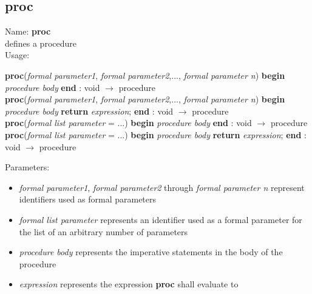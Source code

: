 \subsection{proc}
\label{labproc}
\noindent Name: \textbf{proc}\\
defines a \sollya procedure\\
\noindent Usage: 
\begin{center}
\textbf{proc}(\emph{formal parameter1}, \emph{formal parameter2},..., \emph{formal parameter n}) \textbf{begin} \emph{procedure body} \textbf{end} : \textsf{void} $\rightarrow$ \textsf{procedure}\\
\textbf{proc}(\emph{formal parameter1}, \emph{formal parameter2},..., \emph{formal parameter n}) \textbf{begin} \emph{procedure body} \textbf{return} \emph{expression}; \textbf{end} : \textsf{void} $\rightarrow$ \textsf{procedure}\\
\textbf{proc}(\emph{formal list parameter} = ...) \textbf{begin} \emph{procedure body} \textbf{end} : \textsf{void} $\rightarrow$ \textsf{procedure}\\
\textbf{proc}(\emph{formal list parameter} = ...) \textbf{begin} \emph{procedure body} \textbf{return} \emph{expression}; \textbf{end} : \textsf{void} $\rightarrow$ \textsf{procedure}\\
\end{center}
Parameters: 
\begin{itemize}
\item \emph{formal parameter1}, \emph{formal parameter2} through \emph{formal parameter n} represent identifiers used as formal parameters
\item \emph{formal list parameter} represents an identifier used as a formal parameter for the list of an arbitrary number of parameters
\item \emph{procedure body} represents the imperative statements in the body of the procedure
\item \emph{expression} represents the expression \textbf{proc} shall evaluate to
\end{itemize}
